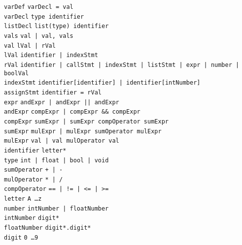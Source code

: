 \documentclass{article}
\newcommand{\keyword}[1]{\colorbox{light-gray}{\texttt{#1}}}
\newcommand{\code}[1]{\texttt{#1}}
\begin{document}
\code{varDef} \textrightarrow \code{varDecl \keyword{=} val} \\
\code{varDecl} \textrightarrow \code{type identifier} \\
\code{listDecl} \textrightarrow \code{\keyword{list(}type\keyword{)} identifier} \\
\code{vals} \textrightarrow \code{val | val, vals } \\
\code{val} \textrightarrow \code{lVal | rVal} \\
\code{lVal} \textrightarrow \code{identifier | indexStmt} \\
\code{rVal} \textrightarrow \code{identifier | callStmt | indexStmt | listStmt | expr | number | boolVal} \\
\code{indexStmt} \textrightarrow \code{identifier\keyword{[}identifier\keyword{]} | identifier\keyword{[}intNumber\keyword{]}} \\
\code{assignStmt} \textrightarrow \code{identifier \keyword{=} rVal} \\

\code{expr} \textrightarrow \code{andExpr | andExpr \keyword{||} andExpr} \\
\code{andExpr} \textrightarrow \code{compExpr | compExpr \keyword{\&\&} compExpr} \\
\code{compExpr} \textrightarrow \code{sumExpr | sumExpr compOperator sumExpr} \\
\code{sumExpr} \textrightarrow \code{mulExpr | mulExpr sumOperator mulExpr} \\
\code{mulExpr} \textrightarrow \code{val | val mulOperator val} \\

\code{identifier} \textrightarrow \code{letter*} \\
\code{type} \textrightarrow \code{\keyword{int} | \keyword{float} | \keyword{bool} | \keyword{void}} \\
\code{sumOperator} \textrightarrow \code{\keyword{+} | \keyword{-}} \\
\code{mulOperator} \textrightarrow \code{\keyword{*} | \keyword{/}} \\
\code{compOperator} \textrightarrow \code{\keyword{==} | \keyword{!=} | \keyword{<=} | \keyword{>=}} \\
\code{letter} \textrightarrow \code{\keyword{A} \ldots \keyword{z}} \\
\code{number} \textrightarrow \code{intNumber | floatNumber} \\
\code{intNumber} \textrightarrow \code{digit*} \\
\code{floatNumber} \textrightarrow \code{digit*.digit*} \\
\code{digit} \textrightarrow \code{\keyword{0} \ldots \keyword{9}} \\
\newpage
\end{document}
